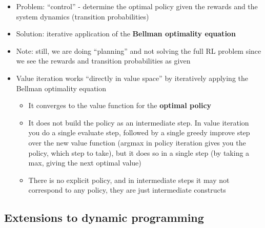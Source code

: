 \documentclass{article}
\begin{document}
\begin{itemize}
    \item Problem: ``control'' - determine the optimal policy given the rewards and the system dynamics (transition probabilities)
    \item Solution: iterative application of the \textbf{Bellman optimality equation}
    \item Note: still, we are doing ``planning'' and not solving the full RL problem since we see the rewards and transition probabilities as given
    \item Value iteration works ``directly in value space'' by iteratively applying the Bellman optimality equation
    \begin{itemize}
        \item It converges to the value function for the \textbf{optimal policy}
        \item It does not build the policy as an intermediate step. In value iteration you do a single evaluate step, followed by a single greedy improve step over the new value function (argmax in policy iteration gives you the policy, which step to take), but it does so in a single step (by taking a max, giving the next optimal value)
        \item There is no explicit policy, and in intermediate steps it may not correspond to any policy, they are just intermediate constructs
    \end{itemize}
\end{itemize}

\subsection{Extensions to dynamic programming}
\end{document}
